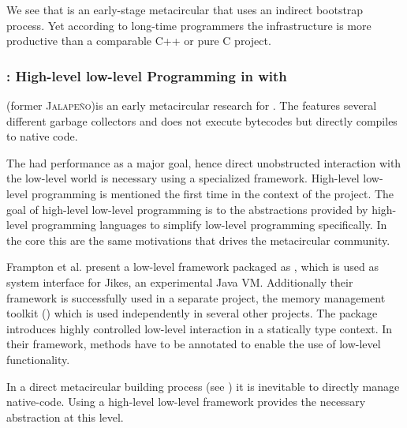 We see that \Squeak is an early-stage metacircular \VM that uses an indirect bootstrap process.
Yet according to long-time \VM programmers the \Squeak infrastructure is more productive than a comparable C++ or pure C project.


\subsubsection*{\Jikes: High-level low-level Programming in with \MMTK}
\Jikes (former \textsc{Jalapeño})is an early metacircular research \VM for \Java \cite{Alpe00a}.
The \Jikes \VM features several different garbage collectors and does not execute bytecodes but directly compiles to native code.

The \Jikes \VM had performance as a major goal, hence direct unobstructed interaction with the low-level world is necessary using a specialized framework.
High-level low-level programming \cite{Fram09a} is mentioned the first time in the context of the \Jikes \VM project.
The goal of high-level low-level programming is to the abstractions provided by high-level programming languages to simplify low-level programming specifically.
In the core this are the same motivations that drives the metacircular \VM community.

Frampton et al. present a low-level framework packaged as , which is used as system interface for Jikes, an experimental Java VM.
Additionally their framework is successfully used in a separate project, the memory management toolkit (\MMTK) \cite{Blac04a} which is used independently in several other projects.
The  package introduces highly controlled low-level interaction in a statically type context.
In their framework, methods have to be annotated to enable the use of low-level functionality.

In a direct metacircular \VM building process (see ) it is inevitable to directly manage native-code.
Using a high-level low-level framework provides the necessary abstraction at this level.

